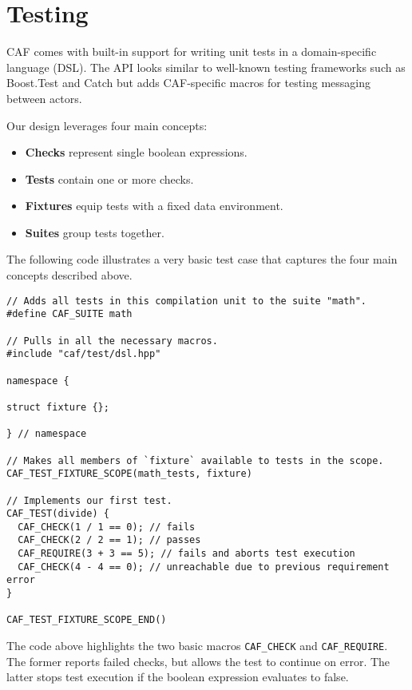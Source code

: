 \section{Testing}
\label{testing}

CAF comes with built-in support for writing unit tests in a domain-specific
language (DSL). The API looks similar to well-known testing frameworks such as
Boost.Test and Catch but adds CAF-specific macros for testing messaging between
actors.

Our design leverages four main concepts:

\begin{itemize}
    \item \textbf{Checks} represent single boolean expressions.
    \item \textbf{Tests} contain one or more checks.
    \item \textbf{Fixtures} equip tests with a fixed data environment.
    \item \textbf{Suites} group tests together.
\end{itemize}

The following code illustrates a very basic test case that captures the four
main concepts described above.

\begin{lstlisting}
// Adds all tests in this compilation unit to the suite "math".
#define CAF_SUITE math

// Pulls in all the necessary macros.
#include "caf/test/dsl.hpp"

namespace {

struct fixture {};

} // namespace

// Makes all members of `fixture` available to tests in the scope.
CAF_TEST_FIXTURE_SCOPE(math_tests, fixture)

// Implements our first test.
CAF_TEST(divide) {
  CAF_CHECK(1 / 1 == 0); // fails
  CAF_CHECK(2 / 2 == 1); // passes
  CAF_REQUIRE(3 + 3 == 5); // fails and aborts test execution
  CAF_CHECK(4 - 4 == 0); // unreachable due to previous requirement error
}

CAF_TEST_FIXTURE_SCOPE_END()
\end{lstlisting}

The code above highlights the two basic macros \lstinline^CAF_CHECK^ and
\lstinline^CAF_REQUIRE^. The former reports failed checks, but allows the test
to continue on error. The latter stops test execution if the boolean expression
evaluates to false.

